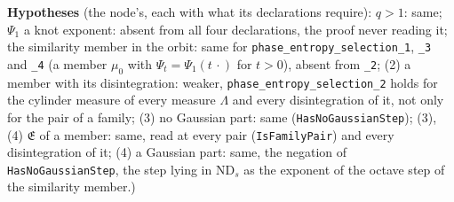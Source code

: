 \begin{theorem}
{\textbf{Hypotheses} (the node's, each with what its declarations require): $q > 1$: same; $\Psi_1$ a
knot exponent: absent from all four declarations, the proof never reading it; the similarity member
in the orbit: same for \texttt{phase\_entropy\_selection\_1}, \texttt{\_3} and \texttt{\_4} (a member
$\mu_0$ with $\Psi_t = \Psi_1(t\,\cdot)$ for $t > 0$), absent from \texttt{\_2}; (2) a member with
its disintegration: weaker, \texttt{phase\_entropy\_selection\_2} holds for the cylinder measure of
every measure $\Lambda$ and every disintegration of it, not only for the pair of a family; (3) no
Gaussian part: same (\texttt{HasNoGaussianStep}); (3), (4) $\mathfrak{E}$ of a member: same, read
at every pair (\texttt{IsFamilyPair}) and every disintegration of it; (4) a Gaussian part: same, the
negation of \texttt{HasNoGaussianStep}, the step lying in $\mathrm{ND}_s$ as the exponent of the
octave step of the similarity member.)}
\end{theorem}

